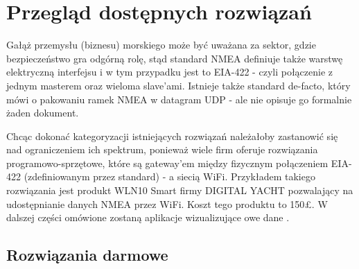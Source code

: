\documentclass[skorowidz,skroty]{dyplomWEZUT}
\begin{document}
\chapter{Przegląd dostępnych rozwiązań}\label{chap: Available solutions}

Gałąż przemysłu (biznesu) morskiego może być uważana za sektor, gdzie bezpieczeństwo gra odgórną rolę, stąd standard NMEA definiuje także warstwę elektryczną interfejsu i w tym przypadku jest to EIA-422 - czyli połączenie z jednym masterem oraz wieloma slave'ami. Istnieje także standard de-facto, który mówi o pakowaniu ramek NMEA w datagram UDP - ale nie opisuje go formalnie żaden dokument.

Chcąc dokonać kategoryzacji istniejących rozwiązań należałoby zastanowić się nad ograniczeniem ich spektrum, ponieważ wiele firm oferuje rozwiązania programowo-sprzętowe, które są gateway'em między fizycznym połączeniem EIA-422 (zdefiniowanym przez standard) - a siecią WiFi. Przykładem takiego rozwiązania jest produkt WLN10 Smart firmy DIGITAL YACHT pozwalający na udostępnianie danych NMEA przez WiFi. Koszt tego produktu to 150£. W dalszej części omówione zostaną aplikacje wizualizujące owe dane .

\section{Rozwiązania darmowe}\label{chap: Free solutions}
\end{document}
